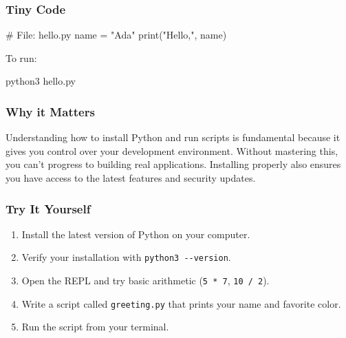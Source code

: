 \documentclass[
  letterpaper,
  DIV=11,
  numbers=noendperiod]{scrreprt}
\newenvironment{Shaded}{\begin{snugshade}}{\end{snugshade}}
\newcommand{\BuiltInTok}[1]{\textcolor[rgb]{0.00,0.23,0.31}{#1}}
\newcommand{\CommentTok}[1]{\textcolor[rgb]{0.37,0.37,0.37}{#1}}
\newcommand{\ExtensionTok}[1]{\textcolor[rgb]{0.00,0.23,0.31}{#1}}
\newcommand{\NormalTok}[1]{\textcolor[rgb]{0.00,0.23,0.31}{#1}}
\newcommand{\OperatorTok}[1]{\textcolor[rgb]{0.37,0.37,0.37}{#1}}
\newcommand{\StringTok}[1]{\textcolor[rgb]{0.13,0.47,0.30}{#1}}
\providecommand{\tightlist}{%
  \setlength{\itemsep}{0pt}\setlength{\parskip}{0pt}}
\begin{document}
\subsubsection{Tiny Code}\label{tiny-code-1}

\begin{Shaded}
\begin{Highlighting}[]
\CommentTok{\# File: hello.py}
\NormalTok{name }\OperatorTok{=} \StringTok{"Ada"}
\BuiltInTok{print}\NormalTok{(}\StringTok{"Hello,"}\NormalTok{, name)}
\end{Highlighting}
\end{Shaded}

To run:

\begin{Shaded}
\begin{Highlighting}[]
\ExtensionTok{python3}\NormalTok{ hello.py}
\end{Highlighting}
\end{Shaded}

\subsubsection{Why it Matters}\label{why-it-matters-1}

Understanding how to install Python and run scripts is fundamental
because it gives you control over your development environment. Without
mastering this, you can't progress to building real applications.
Installing properly also ensures you have access to the latest features
and security updates.

\subsubsection{Try It Yourself}\label{try-it-yourself-1}

\begin{enumerate}
\def\labelenumi{\arabic{enumi}.}
\tightlist
\item
  Install the latest version of Python on your computer.
\item
  Verify your installation with \texttt{python3\ -\/-version}.
\item
  Open the REPL and try basic arithmetic (\texttt{5\ *\ 7},
  \texttt{10\ /\ 2}).
\item
  Write a script called \texttt{greeting.py} that prints your name and
  favorite color.
\item
  Run the script from your terminal.
\end{enumerate}
\end{document}
